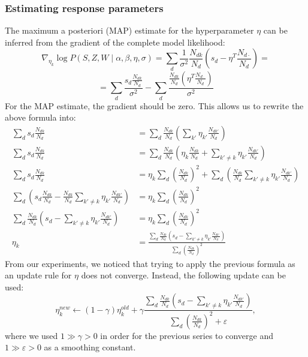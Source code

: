 \documentclass[a4paper,10pt]{article}
\renewcommand{\epsilon}{\varepsilon}
\begin{document}
\subsubsection{Estimating response parameters}
The maximum a posteriori (MAP) estimate for the hyperparameter \(\eta\)  can be inferred from the gradient of the complete model likelihood:
\[ \nabla_{\eta_k} \log P(S, Z, W \mid \alpha, \beta, \eta, \sigma) = \sum_d \frac{1}{\sigma^2} \frac{N_{dk}}{N_d} \left( s_d - \eta^T \frac{N_{d\cdot}}{N_d}\right)  = \]
\[ = \sum_d \frac{s_d \frac{N_{dk}}{N_d} }{\sigma^2} - \sum_d \frac{ \frac{N_{dk}}{N_d} \left( \eta^T \frac{N_{d\cdot}}{N_d} \right) }{\sigma^2}\]
For the MAP estimate, the gradient should be zero.
This allows us to rewrite the above formula into:
\begin{align*}
\sum_d s_d \frac{N_{dk}}{N_d} &= \sum_d \frac{N_{dk}}{N_d} \left( \sum_{k'} \eta_{k'} \frac{N_{dk'}}{N_d} \right)\\
\sum_d s_d \frac{N_{dk}}{N_d} &= \sum_d \frac{N_{dk}}{N_d} \left( \eta_k \frac{N_{dk}}{N_d} + \sum_{k' \ne k} \eta_{k'} \frac{N_{dk'}}{N_d} \right) \\
\sum_d s_d \frac{N_{dk}}{N_d} &= \eta_k \sum_d \left( \frac{N_{dk}}{N_d}  \right)^2 + \sum_d \left( \frac{N_{dk}}{N_d} \sum_{k' \ne k} \eta_{k'} \frac{N_{dk'}}{N_d} \right) \\
\sum_d \left( s_d \frac{N_{dk}}{N_d} - \frac{N_{dk}}{N_d} \sum_{k' \ne k} \eta_{k'} \frac{N_{dk'}}{N_d} \right) &= \eta_k \sum_d \left( \frac{N_{dk}}{N_d}  \right)^2 \\
\sum_d \frac{N_{dk}}{N_d} \left( s_d - \sum_{k' \ne k} \eta_{k'} \frac{N_{dk'}}{N_d} \right) &= \eta_k \sum_d \left( \frac{N_{dk}}{N_d}  \right)^2 \\
\eta_k &= \frac{\sum_d \frac{N_{dk}}{N_d} \left( s_d - \sum_{k' \ne k} \eta_{k'} \frac{N_{dk'}}{N_d} \right)}{\sum_d \left( \frac{N_{dk}}{N_d}  \right)^2} 
\end{align*}
From our experiments, we noticed that trying to apply the previous formula as an update rule for \(\eta\) does not converge.
Instead, the following update can be used:
\begin{equation}
\eta_k^{new} \leftarrow (1 - \gamma) \eta_k^{old} + \gamma \frac{\sum_d \frac{N_{dk}}{N_d} \left( s_d - \sum_{k' \ne k} \eta_{k'} \frac{N_{dk'}}{N_d} \right)}{\sum_d \left( \frac{N_{dk}}{N_d}  \right)^2 + \epsilon},
\end{equation}
where we used $1 \gg \gamma > 0$ in order for the previous series to converge and $1 \gg \epsilon > 0$ as a smoothing constant.
\end{document}
